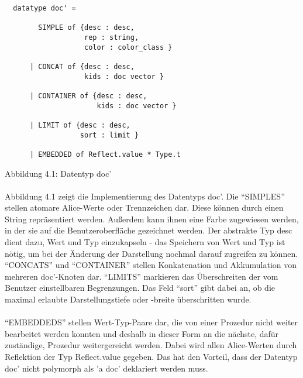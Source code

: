 \documentclass[12pt,a4paper]{article}
\begin{document}
\begin{center}
\begin{verbatim}
  datatype doc' = 
        
        SIMPLE of {desc : desc, 
                   rep : string, 
                   color : color_class }
        
      | CONCAT of {desc : desc, 
                   kids : doc vector }
        
      | CONTAINER of {desc : desc, 
                      kids : doc vector }
        
      | LIMIT of {desc : desc, 
                  sort : limit }
        
      | EMBEDDED of Reflect.value * Type.t  

\end{verbatim}  
Abbildung 4.1: Datentyp doc'
\end{center}

\paragraph{}

Abbildung 4.1 zeigt die Implementierung des Datentyps
doc'. Die ``SIMPLES'' stellen atomare Alice-Werte oder Trennzeichen dar. 
Diese k\"onnen durch einen String repr\"{a}sentiert werden. 
Au\ss erdem kann ihnen eine Farbe zugewiesen werden, in der sie 
auf die Benutzeroberfl\"ache gezeichnet werden. 
Der abstrakte Typ desc dient dazu, Wert und Typ einzukapseln - das
Speichern von Wert und Typ ist n\"otig, um bei der \"Anderung 
der Darstellung nochmal darauf zugreifen zu k\"onnen.
``CONCATS'' und ``CONTAINER'' stellen Konkatenation  
und Akkumulation von mehreren doc'-Knoten dar. 
``LIMITS'' markieren das \"Uberschreiten der 
vom Benutzer einstellbaren Begrenzungen. Das Feld 
``sort'' gibt dabei an, ob die maximal erlaubte Darstellungstiefe
oder -breite \"uberschritten wurde.

\paragraph{}

``EMBEDDEDS'' stellen Wert-Typ-Paare dar, die von einer Prozedur nicht
weiter bearbeitet werden konnten und deshalb in dieser Form an die
n\"achste, daf\"ur zust\"andige, Prozedur weitergereicht werden.
Dabei wird allen Alice-Werten durch Reflektion der Typ Reflect.value
gegeben. Das hat den Vorteil, dass der Datentyp doc' nicht polymorph
als 'a doc' deklariert werden muss.
\end{document}
